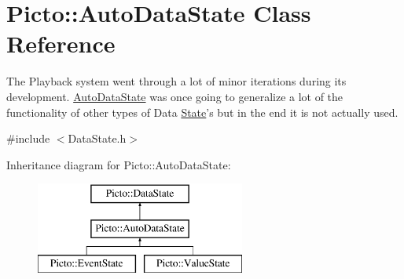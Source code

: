 \hypertarget{class_picto_1_1_auto_data_state}{\section{Picto\-:\-:Auto\-Data\-State Class Reference}
\label{class_picto_1_1_auto_data_state}
}


The Playback system went through a lot of minor iterations during its development. \hyperlink{class_picto_1_1_auto_data_state}{Auto\-Data\-State} was once going to generalize a lot of the functionality of other types of Data \hyperlink{class_picto_1_1_state}{State}'s but in the end it is not actually used.  




{\ttfamily \#include $<$Data\-State.\-h$>$}

Inheritance diagram for Picto\-:\-:Auto\-Data\-State\-:\begin{figure}[H]
\begin{center}
\leavevmode
\includegraphics[height=3.000000cm]{class_picto_1_1_auto_data_state}
\end{center}
\end{figure}

